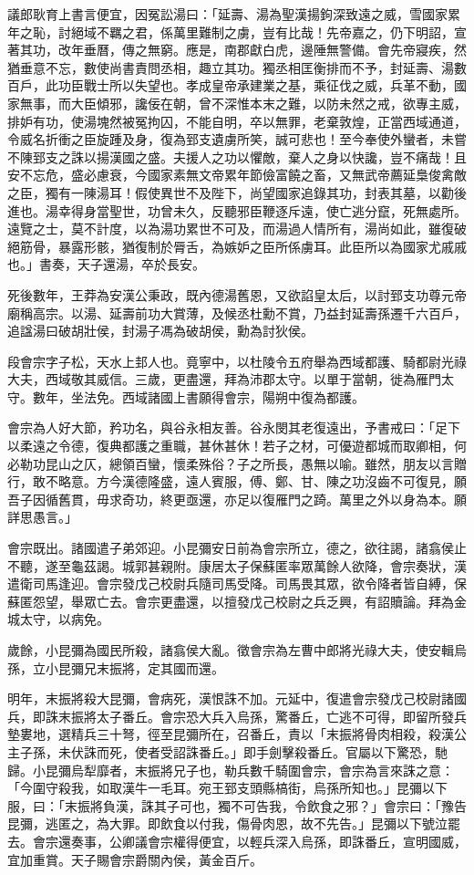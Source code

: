 \begin{pinyinscope}
議郎耿育上書言便宜，因冤訟湯曰：「延壽、湯為聖漢揚鉤深致遠之威，雪國家累年之恥，討絕域不羈之君，係萬里難制之虜，豈有比哉！先帝嘉之，仍下明詔，宣著其功，改年垂曆，傳之無窮。應是，南郡獻白虎，邊陲無警備。會先帝寢疾，然猶垂意不忘，數使尚書責問丞相，趣立其功。獨丞相匡衡排而不予，封延壽、湯數百戶，此功臣戰士所以失望也。孝成皇帝承建業之基，乘征伐之威，兵革不動，國家無事，而大臣傾邪，讒佞在朝，曾不深惟本末之難，以防未然之戒，欲專主威，排妒有功，使湯塊然被冤拘囚，不能自明，卒以無罪，老棄敦煌，正當西域通道，令威名折衝之臣旋踵及身，復為郅支遺虜所笑，誠可悲也！至今奉使外蠻者，未嘗不陳郅支之誅以揚漢國之盛。夫援人之功以懼敵，棄人之身以快讒，豈不痛哉！且安不忘危，盛必慮衰，今國家素無文帝累年節儉富饒之畜，又無武帝薦延梟俊禽敵之臣，獨有一陳湯耳！假使異世不及陛下，尚望國家追錄其功，封表其墓，以勸後進也。湯幸得身當聖世，功曾未久，反聽邪臣鞭逐斥遠，使亡逃分竄，死無處所。遠覽之士，莫不計度，以為湯功累世不可及，而湯過人情所有，湯尚如此，雖復破絕筋骨，暴露形骸，猶復制於脣舌，為嫉妒之臣所係虜耳。此臣所以為國家尤戚戚也。」書奏，天子還湯，卒於長安。

死後數年，王莽為安漢公秉政，既內德湯舊恩，又欲諂皇太后，以討郅支功尊元帝廟稱高宗。以湯、延壽前功大賞薄，及候丞杜勳不賞，乃益封延壽孫遷千六百戶，追諡湯曰破胡壯侯，封湯子馮為破胡侯，勳為討狄侯。

段會宗字子松，天水上邽人也。竟寧中，以杜陵令五府舉為西域都護、騎都尉光祿大夫，西域敬其威信。三歲，更盡還，拜為沛郡太守。以單于當朝，徙為雁門太守。數年，坐法免。西域諸國上書願得會宗，陽朔中復為都護。

會宗為人好大節，矜功名，與谷永相友善。谷永閔其老復遠出，予書戒曰：「足下以柔遠之令德，復典都護之重職，甚休甚休！若子之材，可優遊都城而取卿相，何必勒功昆山之仄，總領百蠻，懷柔殊俗？子之所長，愚無以喻。雖然，朋友以言贈行，敢不略意。方今漢德隆盛，遠人賓服，傅、鄭、甘、陳之功沒齒不可復見，願吾子因循舊貫，毋求奇功，終更亟還，亦足以復雁門之踦。萬里之外以身為本。願詳思愚言。」

會宗既出。諸國遣子弟郊迎。小昆彌安日前為會宗所立，德之，欲往謁，諸翕侯止不聽，遂至龜茲謁。城郭甚親附。康居太子保蘇匿率眾萬餘人欲降，會宗奏狀，漢遣衛司馬逢迎。會宗發戊己校尉兵隨司馬受降。司馬畏其眾，欲令降者皆自縛，保蘇匿怨望，舉眾亡去。會宗更盡還，以擅發戊己校尉之兵乏興，有詔贖論。拜為金城太守，以病免。

歲餘，小昆彌為國民所殺，諸翕侯大亂。徵會宗為左曹中郎將光祿大夫，使安輯烏孫，立小昆彌兄末振將，定其國而還。

明年，末振將殺大昆彌，會病死，漢恨誅不加。元延中，復遣會宗發戊己校尉諸國兵，即誅末振將太子番丘。會宗恐大兵入烏孫，驚番丘，亡逃不可得，即留所發兵墊婁地，選精兵三十弩，徑至昆彌所在，召番丘，責以「末振將骨肉相殺，殺漢公主子孫，未伏誅而死，使者受詔誅番丘。」即手劍擊殺番丘。官屬以下驚恐，馳歸。小昆彌烏犁靡者，末振將兄子也，勒兵數千騎圍會宗，會宗為言來誅之意：「今圍守殺我，如取漢牛一毛耳。宛王郅支頭縣槁街，烏孫所知也。」昆彌以下服，曰：「末振將負漢，誅其子可也，獨不可告我，令飲食之邪？」會宗曰：「豫告昆彌，逃匿之，為大罪。即飲食以付我，傷骨肉恩，故不先告。」昆彌以下號泣罷去。會宗還奏事，公卿議會宗權得便宜，以輕兵深入烏孫，即誅番丘，宣明國威，宜加重賞。天子賜會宗爵關內侯，黃金百斤。


\end{pinyinscope}
